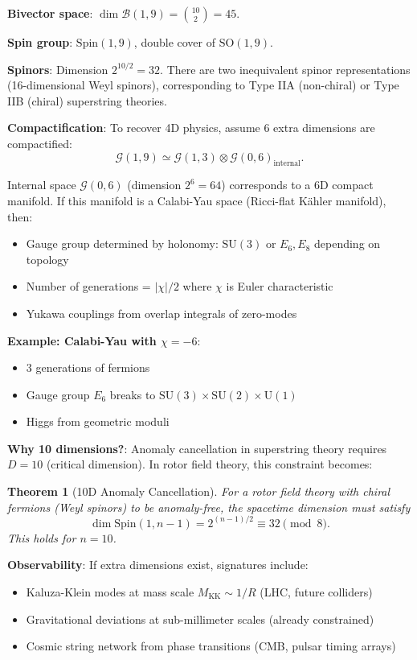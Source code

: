 \documentclass[11pt,a4paper]{article}
\numberwithin{equation}{section}
\theoremstyle{plain}
\newtheorem{theorem}{Theorem}[section]
\theoremstyle{definition}
\theoremstyle{remark}
\newcommand{\Cl}{\mathcal{G}}               %
\newcommand{\Biv}{\mathcal{B}}             %
\newcommand{\Spin}{\mathrm{Spin}}
\newcommand{\SO}{\mathrm{SO}}
\begin{document}
\textbf{Bivector space}: $\dim \Biv(1,9) = \binom{10}{2} = 45$.

\textbf{Spin group}: $\Spin(1,9)$, double cover of $\SO(1,9)$.

\textbf{Spinors}: Dimension $2^{10/2} = 32$. There are two inequivalent spinor representations (16-dimensional Weyl spinors), corresponding to Type IIA (non-chiral) or Type IIB (chiral) superstring theories.

\textbf{Compactification}: To recover 4D physics, assume 6 extra dimensions are compactified:
\begin{equation}
\Cl(1,9) \simeq \Cl(1,3) \otimes \Cl(0,6)_{\text{internal}}.
\end{equation}

Internal space $\Cl(0,6)$ (dimension $2^6 = 64$) corresponds to a 6D compact manifold. If this manifold is a Calabi-Yau space (Ricci-flat Kähler manifold), then:
\begin{itemize}
\item Gauge group determined by holonomy: $\mathrm{SU}(3)$ or $E_6, E_8$ depending on topology
\item Number of generations = $|\chi|/2$ where $\chi$ is Euler characteristic
\item Yukawa couplings from overlap integrals of zero-modes
\end{itemize}

\textbf{Example: Calabi-Yau with $\chi = -6$}:
\begin{itemize}
\item 3 generations of fermions
\item Gauge group $E_6$ breaks to $\mathrm{SU}(3) \times \mathrm{SU}(2) \times \mathrm{U}(1)$
\item Higgs from geometric moduli
\end{itemize}

\textbf{Why 10 dimensions?}: Anomaly cancellation in superstring theory requires $D=10$ (critical dimension). In rotor field theory, this constraint becomes:

\begin{theorem}[10D Anomaly Cancellation]
For a rotor field theory with chiral fermions (Weyl spinors) to be anomaly-free, the spacetime dimension must satisfy
\begin{equation}
\dim \Spin(1,n-1) = 2^{(n-1)/2} \equiv 32 \pmod{8}.
\end{equation}
This holds for $n=10$.
\end{theorem}

\textbf{Observability}: If extra dimensions exist, signatures include:
\begin{itemize}
\item Kaluza-Klein modes at mass scale $M_{\text{KK}} \sim 1/R$ (LHC, future colliders)
\item Gravitational deviations at sub-millimeter scales (already constrained)
\item Cosmic string network from phase transitions (CMB, pulsar timing arrays)
\end{itemize}
\end{document}
